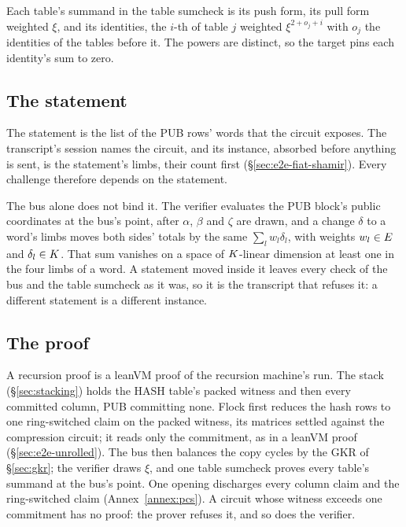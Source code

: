 Each table's summand in the table sumcheck is its push form, its pull form weighted $\xi$, and its identities, the $i$-th of table $j$ weighted $\xi^{2+o_j+i}$ with $o_j$ the identities of the tables before it. The powers are distinct, so the target pins each identity's sum to zero.

\subsection{The statement}\label{rec:statement}

The statement is the list of the \textsf{PUB} rows' words that the circuit exposes. The transcript's session names the circuit, and its instance, absorbed before anything is sent, is the statement's limbs, their count first (\S\ref{sec:e2e-fiat-shamir}). Every challenge therefore depends on the statement.

The bus alone does not bind it. The verifier evaluates the \textsf{PUB} block's public coordinates at the bus's point, after $\alpha$, $\beta$ and $\zeta$ are drawn, and a change $\delta$ to a word's limbs moves both sides' totals by the same $\sum_l w_l\delta_l$, with weights $w_l\in E$ and $\delta_l\in K$. That sum vanishes on a space of $K$-linear dimension at least one in the four limbs of a word. A statement moved inside it leaves every check of the bus and the table sumcheck as it was, so it is the transcript that refuses it: a different statement is a different instance.

\subsection{The proof}\label{rec:proof}

A recursion proof is a leanVM proof of the recursion machine's run. The stack (\S\ref{sec:stacking}) holds the \textsf{HASH} table's packed witness and then every committed column, \textsf{PUB} committing none. Flock first reduces the hash rows to one ring-switched claim on the packed witness, its matrices settled against the compression circuit; it reads only the commitment, as in a leanVM proof (\S\ref{sec:e2e-unrolled}). The bus then balances the copy cycles by the GKR of \S\ref{sec:gkr}; the verifier draws $\xi$, and one table sumcheck proves every table's summand at the bus's point. One opening discharges every column claim and the ring-switched claim (Annex~\ref{annex:pcs}). A circuit whose witness exceeds one commitment has no proof: the prover refuses it, and so does the verifier.


